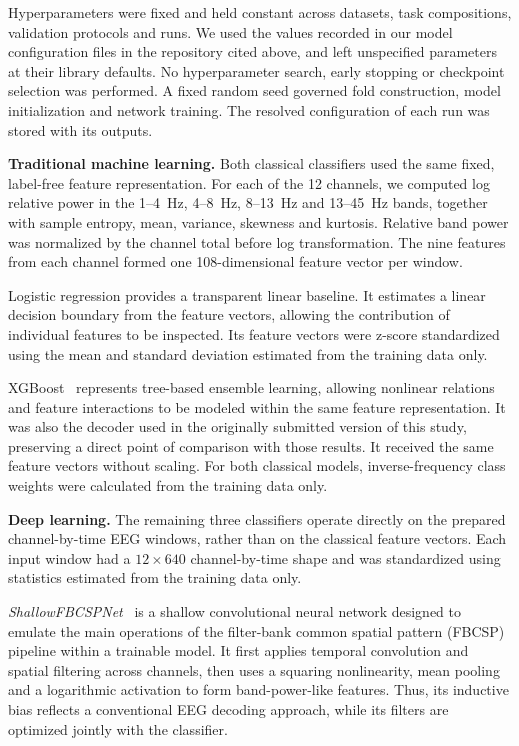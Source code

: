 \documentclass[10pt,letterpaper]{article}
\newcommand{\rev}[1]{#1}
\begin{document}
\rev{Hyperparameters were fixed and held constant across
datasets, task compositions, validation protocols and runs. We used the values
recorded in our model configuration files in the repository cited above, and
left unspecified parameters at their library defaults. No hyperparameter search, early stopping or
checkpoint selection was performed. A fixed random seed
governed fold construction, model initialization and network training. The
resolved configuration of each run was stored with its outputs.}

\textbf{Traditional machine learning.}
\rev{Both classical classifiers used the same fixed, label-free feature
representation. For each of the 12 channels, we computed log relative power in
the 1--4~Hz, 4--8~Hz, 8--13~Hz and 13--45~Hz bands, together with sample
entropy, mean, variance, skewness and kurtosis. Relative band power was
normalized by the channel total before log transformation. The nine features
from each channel formed one 108-dimensional feature vector per window.}

\rev{Logistic regression provides a transparent linear baseline. It estimates
a linear decision boundary from the feature vectors, allowing the contribution
of individual features to be inspected. Its feature vectors were z-score
standardized using the mean and standard deviation estimated from the training
data only.}

\rev{XGBoost~\cite{chen2016xgboost} represents tree-based ensemble learning,
allowing nonlinear relations and feature interactions to be modeled within the
same feature representation. It was also the decoder used in the originally
submitted version of this study, preserving a direct point of comparison with
those results. It received the same feature vectors without scaling. For both
classical models, inverse-frequency class weights were calculated from the
training data only.}

\textbf{Deep learning.}
\rev{The remaining three classifiers operate directly on the prepared
channel-by-time EEG windows, rather than on the classical feature vectors. Each
input window had a $12 \times 640$ channel-by-time shape and was standardized
using statistics estimated from the training data only.}

\rev{\textit{ShallowFBCSPNet}~\cite{schirrmeister2017deep} is a shallow
convolutional neural network designed to emulate the main operations of the
filter-bank common spatial pattern (FBCSP) pipeline within a trainable model.
It first applies temporal convolution and spatial filtering across channels,
then uses a squaring nonlinearity, mean pooling and a logarithmic activation to
form band-power-like features. Thus, its inductive bias reflects a conventional
EEG decoding approach, while its filters are optimized jointly with the
classifier.}
\end{document}
